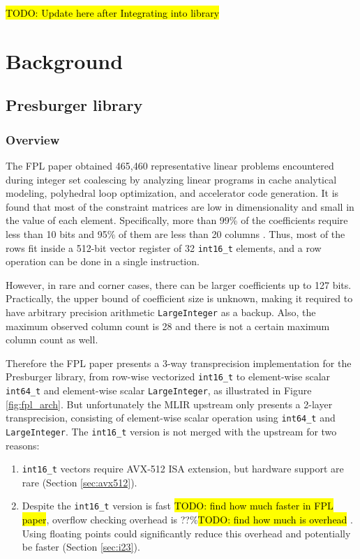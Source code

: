\documentclass[logo,bsc,singlespacing,parskip]{infthesis}
\newenvironment{compactlist}
{ \begin{enumerate}
    \setlength{\itemsep}{0pt}
    \setlength{\parskip}{0pt}
    \setlength{\parsep}{0pt}     
}
{ \end{enumerate} }
\begin{document}
\hl{TODO: Update here after Integrating into library}



\chapter{Background}
\section{Presburger library}
\subsection{Overview}

The FPL paper obtained 465,460 representative linear problems encountered during
integer set coalescing by analyzing linear programs in cache analytical
modeling, polyhedral loop optimization, and accelerator code generation. It is
found that most of the constraint matrices are low in dimensionality and small
in the value of each element. Specifically, more than 99\% of the coefficients
require less than 10 bits and 95\% of them are less than 20 columns \cite{FPL1}.
Thus, most of the rows fit inside a 512-bit vector register of 32
\texttt{int16\_t} elements, and a row operation can be done in a single
instruction. 

However, in rare and corner cases, there can be larger coefficients up to 127
bits. Practically, the upper bound of coefficient size is unknown, making it
required to have arbitrary precision arithmetic \texttt{LargeInteger} as a
backup. Also, the maximum observed column count is 28 and there is not a certain
maximum column count as well. 

Therefore the FPL paper presents a 3-way transprecision implementation for the
Presburger library, from row-wise vectorized \texttt{int16\_t} to element-wise
scalar \texttt{int64\_t} and element-wise scalar \texttt{LargeInteger}, as
illustrated in Figure \ref{fig:fpl_arch}. But unfortunately the MLIR upstream
only presents a 2-layer transprecision, consisting of element-wise scalar
operation using \texttt{int64\_t} and \texttt{LargeInteger}. The
\texttt{int16\_t} version is not merged with the upstream for two reasons: 
\begin{compactlist} 
    \item \texttt{int16\_t} vectors require AVX-512 ISA extension, but hardware
    support are rare (Section \ref{sec:avx512}). 
    \item Despite the \texttt{int16\_t} version is fast \hl{TODO: find how much
    faster in FPL paper}, overflow checking overhead is ??\%\hl{TODO: find how
    much is overhead} \cite{FPL2}. Using floating points could significantly
    reduce this overhead and potentially be faster (Section \ref{sec:i23}).  
\end{compactlist}
\end{document}

